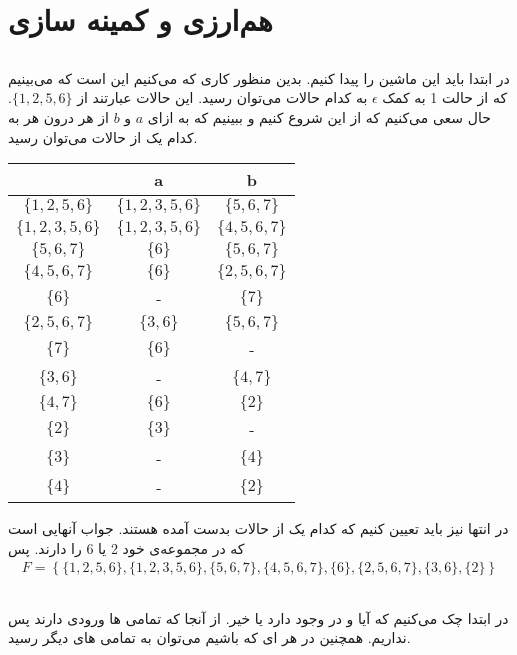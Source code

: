 \section{هم‌ارزی و کمینه سازی}
\subsection{}
در ابتدا باید
این ماشین را پیدا کنیم. بدین منظور کاری که می‌کنیم این است که می‌بینیم که از حالت
1
به کمک
$\epsilon$
به کدام حالات می‌توان رسید. این حالات عبارتند از
$\{1,2,5,6\}$.
حال سعی می‌‌کنیم که از این
شروع کنیم و ببینیم که به ازای
$a$
و
$b$
از هر
درون هر
به کدام یک از حالات می‌توان رسید.
\begin{latin}
    \centering
    \begin{tabular}{c|cc}
        & a & b\\
        \hline
        $\{1,2,5,6\}$ & $\{1,2,3,5,6\}$ & $\{5,6,7\}$ \\
        $\{1,2,3,5,6\}$ & $\{1,2,3,5,6\}$ & $\{4,5,6,7\}$ \\
        $\{5,6,7\}$ & $\{6\}$ & $\{5,6,7\}$ \\
        $\{4,5,6,7\}$ & $\{6\}$ & $\{2,5,6,7\}$ \\
        $\{6\}$ & - & $\{7\}$ \\
        $\{2,5,6,7\}$ & $\{3,6\}$ & $\{5,6,7\}$ \\
        $\{7\}$ & $\{6\}$ & - \\
        $\{3,6\}$ & - & $\{4,7\}$\\
        $\{4,7\}$ & $\{6\}$ & $\{2\}$\\
        $\{2\}$ & $\{3\}$ & - \\
        $\{3\}$ & - & $\{4\}$\\
        $\{4\}$ & - & $\{2\}$
    \end{tabular}
\end{latin}
در انتها نیز باید تعیین کنیم که کدام یک از حالات بدست آمده
هستند. جواب آنهایی است که در مجموعه‌ی خود 2 یا 6 را دارند. پس
\begin{gather*}
    F = \left\{\{1,2,5,6\},\{1,2,3,5,6\},\{5,6,7\},\{4,5,6,7\},\{6\},\{2,5,6,7\},\{3,6\},\{2\}\right\}
\end{gather*}
\subsection{}
در ابتدا چک می‌کنیم که آیا
 و 
در
وجود دارد یا خیر. از آنجا که تمامی
ها
ورودی دارند پس
نداریم. همچنین در هر
ای
که باشیم می‌توان به تمامی
های
دیگر رسید.

